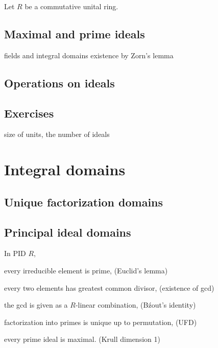 \documentclass{../../large}
\begin{document}
\begin{prb}
Let $R$ be a commutative unital ring.
\end{prb}

\begin{prb}
\end{prb}
\begin{prb}
\end{prb}


\section{Maximal and prime ideals}
fields and integral domains
existence by Zorn's lemma

\section{Operations on ideals}

\section*{Exercises}
size of units, the number of ideals








\chapter{Integral domains}
\section{Unique factorization domains}
\section{Principal ideal domains}

\begin{prb}
In PID $R$,
\begin{parts}
\item every irreducible element is prime, \hfill(Euclid's lemma)
\item every two elements has greatest common divisor, \hfill(existence of gcd)
\item the gcd is given as a $R$-linear combination, \hfill(B\'zout's identity)
\item factorization into primes is unique up to permutation, \hfill(UFD)
\item every prime ideal is maximal. \hfill(Krull dimension 1)
\end{parts}
\end{prb}
\end{document}
